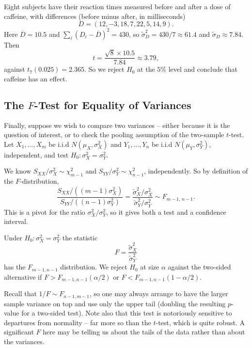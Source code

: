 \begin{example}
  Eight subjects have their reaction times measured before and after a dose of caffeine, with differences (before minus after, in milliseconds)
  $$
  D = (12, -3, 18, 7, 22, 5, 14, 9).
  $$
  Here $\overline{D} = 10.5$ and $\sum_i (D_i - \overline{D})^2 = 430$, so $\tilde\sigma_D^2 = 430/7 \approx 61.4$ and $\tilde\sigma_D \approx 7.84$. Then
  $$
  t = \frac{\sqrt 8 \times 10.5}{7.84} \approx 3.79,
  $$
  against $t_7(0.025) = 2.365$. So we reject $H_0$ at the $5\%$ level and conclude that caffeine has an effect.
\end{example}

\subsection{The \texorpdfstring{$F$}{F}-Test for Equality of Variances}

Finally, suppose we wish to compare two variances -- either because it is the question of interest, or to check the pooling assumption of the two-sample $t$-test. Let $X_1,\dots,X_m$ be i.i.d $N(\mu_X,\sigma_X^2)$ and $Y_1,\dots,Y_n$ be i.i.d $N(\mu_Y,\sigma_Y^2)$, independent, and test $H_0 : \sigma_X^2 = \sigma_Y^2$.

We know $S_{XX}/\sigma_X^2\sim\chi^2_{m-1}$ and $S_{YY}/\sigma_Y^2\sim\chi^2_{n-1}$, independently. So by definition of the $F$-distribution,
$$
\frac{S_{XX}/\left((m-1)\sigma_X^2\right)}{S_{YY}/\left((n-1)\sigma_Y^2\right)} = \frac{\tilde\sigma_X^2/\sigma_X^2}{\tilde\sigma_Y^2/\sigma_Y^2}\sim F_{m-1,\,n-1}.
$$
This is a pivot for the ratio $\sigma_X^2/\sigma_Y^2$, so it gives both a test and a confidence interval.

\begin{definition}
  Under $H_0 : \sigma_X^2 = \sigma_Y^2$ the statistic
  $$
  F = \frac{\tilde\sigma_X^2}{\tilde\sigma_Y^2}
  $$
  has the $F_{m-1,n-1}$ distribution. We reject $H_0$ at size $\alpha$ against the two-sided alternative if $F > F_{m-1,n-1}(\alpha/2)$ or $F < F_{m-1,n-1}(1-\alpha/2)$.
\end{definition}

\begin{remark}
  Recall that $1/F \sim F_{n-1,m-1}$, so one may always arrange to have the larger sample variance on top and use only the upper tail (doubling the resulting $p$-value for a two-sided test). Note also that this test is notoriously sensitive to departures from normality -- far more so than the $t$-test, which is quite robust. A significant $F$ here may be telling us about the tails of the data rather than about the variances.
\end{remark}

